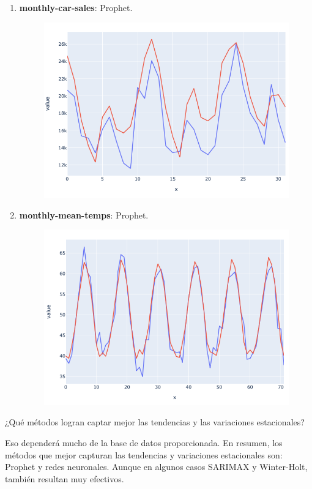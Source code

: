 \begin{problema}
\begin{sol}
\begin{enumerate}
\begin{figure}[H]
			\end{figure}
			\item \textbf{monthly-car-sales}: Prophet. 
			\begin{figure}[H]
				\centering 
				\includegraphics[scale=0.5]{Images/1.3}
			\end{figure}
			\item \textbf{monthly-mean-temps}: Prophet. 
			\begin{figure}[H]
				\centering 
				\includegraphics[scale=0.5]{Images/1.4}
			\end{figure}
		\end{enumerate}
	\end{sol}
\end{problema}

\begin{problema}
	¿Qué métodos logran captar mejor las tendencias y las variaciones estacionales? 
	\begin{sol}
		Eso dependerá mucho de la base de datos proporcionada. En resumen, los métodos que mejor capturan las tendencias y variaciones estacionales son: Prophet y redes neuronales. Aunque en algunos casos SARIMAX y Winter-Holt, también resultan muy efectivos.
	\end{sol}
\end{problema}

